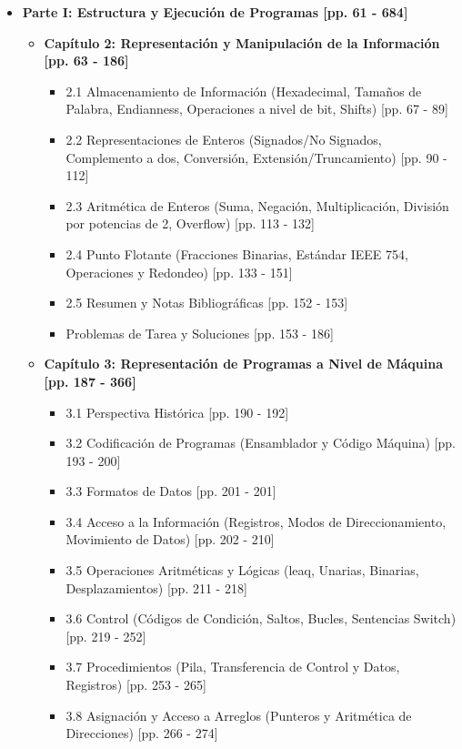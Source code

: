 \documentclass[11pt,a4paper]{article}
\begin{document}
\begin{itemize}
    \item \textbf{Parte I: Estructura y Ejecución de Programas [pp. 61 - 684]}
    \begin{itemize}
        \item \textbf{Capítulo 2: Representación y Manipulación de la Información [pp. 63 - 186]}
        \begin{itemize}
            \item 2.1 Almacenamiento de Información (Hexadecimal, Tamaños de Palabra, Endianness, Operaciones a nivel de bit, Shifts) [pp. 67 - 89]
            \item 2.2 Representaciones de Enteros (Signados/No Signados, Complemento a dos, Conversión, Extensión/Truncamiento) [pp. 90 - 112]
            \item 2.3 Aritmética de Enteros (Suma, Negación, Multiplicación, División por potencias de 2, Overflow) [pp. 113 - 132]
            \item 2.4 Punto Flotante (Fracciones Binarias, Estándar IEEE 754, Operaciones y Redondeo) [pp. 133 - 151]
            \item 2.5 Resumen y Notas Bibliográficas [pp. 152 - 153]
            \item Problemas de Tarea y Soluciones [pp. 153 - 186]
        \end{itemize}
        \item \textbf{Capítulo 3: Representación de Programas a Nivel de Máquina [pp. 187 - 366]}
        \begin{itemize}
            \item 3.1 Perspectiva Histórica [pp. 190 - 192]
            \item 3.2 Codificación de Programas (Ensamblador y Código Máquina) [pp. 193 - 200]
            \item 3.3 Formatos de Datos [pp. 201 - 201]
            \item 3.4 Acceso a la Información (Registros, Modos de Direccionamiento, Movimiento de Datos) [pp. 202 - 210]
            \item 3.5 Operaciones Aritméticas y Lógicas (leaq, Unarias, Binarias, Desplazamientos) [pp. 211 - 218]
            \item 3.6 Control (Códigos de Condición, Saltos, Bucles, Sentencias Switch) [pp. 219 - 252]
            \item 3.7 Procedimientos (Pila, Transferencia de Control y Datos, Registros) [pp. 253 - 265]
            \item 3.8 Asignación y Acceso a Arreglos (Punteros y Aritmética de Direcciones) [pp. 266 - 274]

\end{itemize}
\end{itemize}
\end{itemize}
\end{document}

